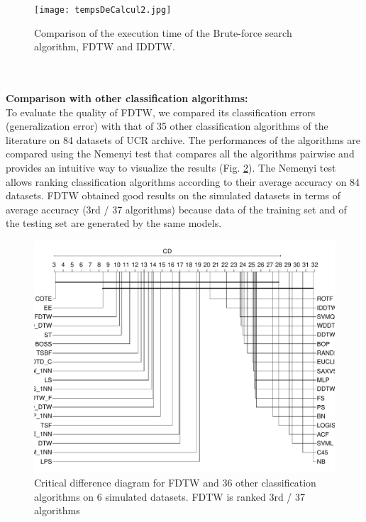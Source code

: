 \begin{figure}
\center
\texttt{[image: tempsDeCalcul2.jpg]}
\caption{Comparison of the execution time of
the Brute-force search algorithm, FDTW and IDDTW. }

\label{tempsDeCalcul}

\end{figure}



\\
 \paragraph{}\textbf{Comparison with other classification algorithms:}  \\
To evaluate the quality of FDTW, we compared its classification errors (generalization error) with that of 35 other classification algorithms \cite{bagnall2016great} of the literature on 84 datasets of UCR archive{{}}.
 The performances of the algorithms are compared using 
the Nemenyi test that compares all the algorithms pairwise and  provides an intuitive way to
visualize the results (Fig. \ref{cd2}). The Nemenyi test allows ranking  classification algorithms according to their average accuracy on 84 datasets.
 FDTW obtained good results on the simulated datasets in terms of average accuracy (3rd / 37 algorithms) because  data of the training set and of the testing set are generated by the same models.

\begin{figure}
\centering
\includegraphics[scale=0.33]{images/cd1}
\caption{Critical difference diagram for FDTW and $36$ other classification algorithms on 6 simulated datasets. FDTW is ranked 3rd / 37 algorithms}

\label{cd2}
\end{figure}



